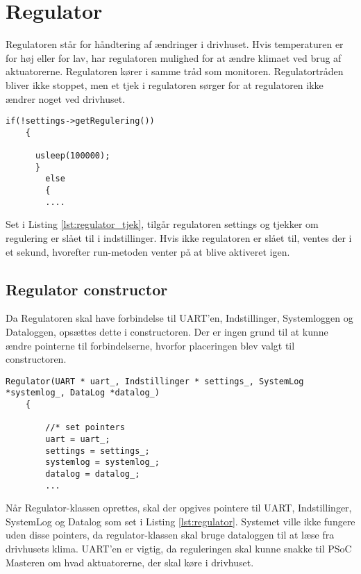 \section{Regulator} \label{sec:Regulator_impl}

Regulatoren står for håndtering af ændringer i drivhuset. Hvis temperaturen er for høj eller for lav, har regulatoren mulighed for at ændre klimaet ved brug af aktuatorerne. Regulatoren kører i samme tråd som monitoren.
Regulatortråden bliver ikke stoppet, men et tjek i regulatoren sørger for at regulatoren ikke ændrer noget ved drivhuset.

\begin{lstlisting}[caption=Regulatorens tjek af settings, label=lst:regulator_tjek]
if(!settings->getRegulering())
	{
	
	  usleep(100000);
	  }
		else 
		{
		....
\end{lstlisting}

Set i Listing \ref{lst:regulator_tjek}, tilgår regulatoren settings og tjekker om regulering er slået til i indstillinger. Hvis ikke regulatoren er slået til, ventes der i et sekund, hvorefter run-metoden venter på at blive aktiveret igen. 

\subsection{Regulator constructor}

Da Regulatoren skal have forbindelse til UART'en, Indstillinger, Systemloggen og Dataloggen, opsættes dette i constructoren. Der er ingen grund til at kunne ændre pointerne til forbindelserne, hvorfor placeringen blev valgt til constructoren.

\begin{lstlisting}[caption=Regulator(), label=lst:regulator]
	Regulator(UART * uart_, Indstillinger * settings_, SystemLog *systemlog_, DataLog *datalog_)																															
	{
		
		//* set pointers
		uart = uart_;
		settings = settings_;
		systemlog = systemlog_;
		datalog = datalog_;
		...
\end{lstlisting}

Når Regulator-klassen oprettes, skal der opgives pointere til UART, Indstillinger, SystemLog og Datalog som set i Listing \ref{lst:regulator}. Systemet ville ikke fungere uden disse pointers, da regulator-klassen skal bruge dataloggen til at læse fra drivhusets klima. UART'en er vigtig, da reguleringen skal kunne snakke til PSoC Masteren om hvad aktuatorerne, der skal køre i drivhuset.

